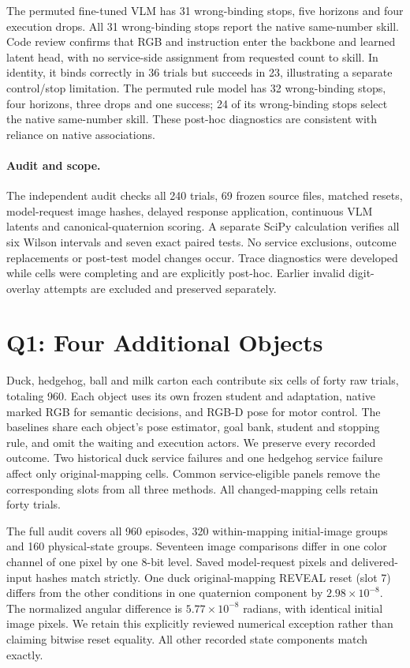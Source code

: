 The permuted fine-tuned VLM has 31 wrong-binding stops, five horizons and four execution drops. All 31 wrong-binding stops report the native same-number skill. Code review confirms that RGB and instruction enter the backbone and learned latent head, with no service-side assignment from requested count to skill. In identity, it binds correctly in 36 trials but succeeds in 23, illustrating a separate control/stop limitation. The permuted rule model has 32 wrong-binding stops, four horizons, three drops and one success; 24 of its wrong-binding stops select the native same-number skill. These post-hoc diagnostics are consistent with reliance on native associations.



\paragraph{Audit and scope.}
The independent audit checks all 240 trials, 69 frozen source files, matched resets, model-request image hashes, delayed response application, continuous VLM latents and canonical-quaternion scoring. A separate SciPy calculation verifies all six Wilson intervals and seven exact paired tests. No service exclusions, outcome replacements or post-test model changes occur. Trace diagnostics were developed while cells were completing and are explicitly post-hoc. Earlier invalid digit-overlay attempts are excluded and preserved separately.

\section{Q1: Four Additional Objects}
Duck, hedgehog, ball and milk carton each contribute six cells of forty raw trials, totaling 960. Each object uses its own frozen student and adaptation, native marked RGB for semantic decisions, and RGB-D pose for motor control. The baselines share each object's pose estimator, goal bank, student and stopping rule, and omit the waiting and execution actors. We preserve every recorded outcome. Two historical duck service failures and one hedgehog service failure affect only original-mapping cells. Common service-eligible panels remove the corresponding slots from all three methods. All changed-mapping cells retain forty trials.

The full audit covers all 960 episodes, 320 within-mapping initial-image groups and 160 physical-state groups. Seventeen image comparisons differ in one color channel of one pixel by one 8-bit level. Saved model-request pixels and delivered-input hashes match strictly. One duck original-mapping REVEAL reset (slot 7) differs from the other conditions in one quaternion component by $2.98\times10^{-8}$. The normalized angular difference is $5.77\times10^{-8}$ radians, with identical initial image pixels. We retain this explicitly reviewed numerical exception rather than claiming bitwise reset equality. All other recorded state components match exactly.

